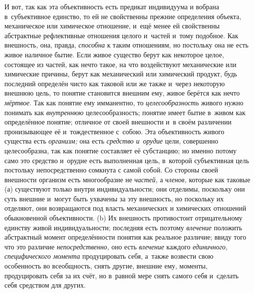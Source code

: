 И вот, так как эта объективность есть предикат индивидуума и
вобрана в~субъективное единство, то ей не свойственны прежние определения
объекта, механическое или химическое отношение, и~ещё менее ей свойственны
абстрактные рефлективные отношения целого и~частей и~тому подобное. Как
внешность, она, правда, {\em способна}
к таким отношениям, но постольку она не есть живое наличное
бытие. Если живое существо берут как некоторое целое, состоящее из частей,
как нечто такое, на что воздействуют механические или химические причины,
берут как механический или химический продукт, будь последний определён
чисто как таковой или же также и~через некоторую внешнюю
цель, то понятие становится внешним ему, живое берётся как нечто
{\em мёртвое}. Так как
понятие ему имманентно, то
{\em целесообразность}
живого нужно понимать как
{\em внутреннюю}
целесообразность; понятие имеет бытие в~живом как
определённое понятие; отличное от своей внешности и~в своём различении
пронизывающее её и~тождественное с~собою. Эта объективность живого существа
есть {\em организм;} она есть {\em средство и~орудие}
цели, совершенно целесообразна, так как понятие составляет её
субстанцию; но именно потому само это средство и~орудие есть выполненная
цель, в~которой субъективная цель постольку непосредственно сомкнута с
самой собой. Со стороны своей внешности организм есть многообразие не
{\em частей,} а
{\em членов,} которые как
таковые (а) существуют только внутри индивидуальности; они отделимы,
поскольку они суть внешние и~могут быть ухвачены за эту внешность, но
поскольку их отделяют, они возвращаются под власть механических и
химических отношений обыкновенной объективности. (b) Их внешность
противостоит отрицательному единству живой индивидуальности; последняя есть
поэтому {\em влечение}
положить абстрактный момент определённости понятия как
реальное различие; ввиду того что это различие
{\em непосредственно,}
оно есть {\em влечение}
каждого {\em единичного,}
{\em специфического момента}
продуцировать себя, а~также возвести свою особенность во
всеобщность, снять другие, внешние ему, моменты, продуцировать себя за их
счёт, но в~равной мере снять самого себя и~сделать себя средством для
других.

